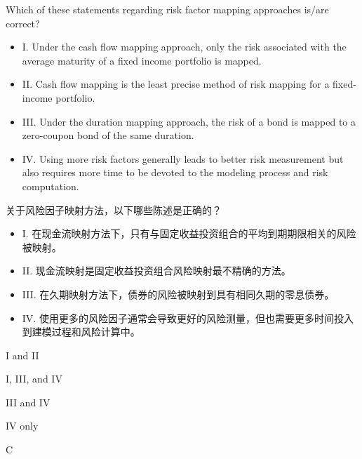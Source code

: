 \documentclass{article}
\newcounter{question} %
\begin{document}
\begin{question}
    Which of these statements regarding risk factor mapping approaches is/are correct? 
\begin{itemize}
   \item I. Under the cash flow mapping approach, only the risk associated with the average maturity of a fixed income portfolio is mapped. 
    
    \item II. Cash flow mapping is the least precise method of risk mapping for a fixed-income portfolio. 
    
    \item III. Under the duration mapping approach, the risk of a bond is mapped to a zero-coupon bond of the same duration. 
    
    \item IV. Using more risk factors generally leads to better risk measurement but also requires more time to be devoted to the modeling process and risk computation.
\end{itemize}
关于风险因子映射方法，以下哪些陈述是正确的？
\begin{itemize}
   \item I. 在现金流映射方法下，只有与固定收益投资组合的平均到期期限相关的风险被映射。
    
    \item II. 现金流映射是固定收益投资组合风险映射最不精确的方法。
    
    \item III. 在久期映射方法下，债券的风险被映射到具有相同久期的零息债券。
    
    \item IV. 使用更多的风险因子通常会导致更好的风险测量，但也需要更多时间投入到建模过程和风险计算中。
\end{itemize}
\end{question}

\begin{choices}
    \item I and II
    \item I, III, and IV
    \item III and IV
    \item IV only
\end{choices}

\begin{correctanswer}
    C
\end{correctanswer}
\end{document}
